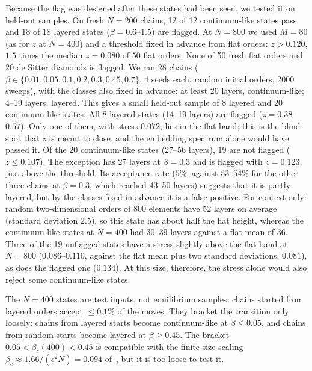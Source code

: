 \documentclass[12pt]{iopart}
\begin{document}
Because the flag was designed after these states had been seen, we tested it on held-out samples. On fresh $N=200$ chains, 12 of 12 continuum-like states pass and 18 of 18 layered states ($\beta=0.6$--$1.5$) are flagged. At $N=800$ we used $M=80$ (as for $z$ at $N=400$) and a threshold fixed in advance from flat orders: $z>0.120$, $1.5$ times the median $z=0.080$ of 50 flat orders. None of 50 fresh flat orders and 20 de Sitter diamonds is flagged. We ran 28 chains ($\beta\in\{0.01,0.05,0.1,0.2,0.3,0.45,0.7\}$, 4 seeds each, random initial orders, 2000 sweeps), with the classes also fixed in advance: at least 20 layers, continuum-like; 4--19 layers, layered. This gives a small held-out sample of 8 layered and 20 continuum-like states. All 8 layered states (14--19 layers) are flagged ($z=0.38$--$0.57$). Only one of them, with stress $0.072$, lies in the flat band; this is the blind spot that $z$ is meant to close, and the embedding spectrum alone would have passed it. Of the 20 continuum-like states (27--56 layers), 19 are not flagged ($z\leq0.107$). The exception has 27 layers at $\beta=0.3$ and is flagged with $z=0.123$, just above the threshold. Its acceptance rate ($5\%$, against $53$--$54\%$ for the other three chains at $\beta=0.3$, which reached 43--50 layers) suggests that it is partly layered, but by the classes fixed in advance it is a false positive. For context only: random two-dimensional orders of $800$ elements have $52$ layers on average (standard deviation $2.5$), so this state has about half the flat height, whereas the continuum-like states at $N=400$ had $30$--$39$ layers against a flat mean of $36$. Three of the 19 unflagged states have a stress slightly above the flat band at $N=800$ ($0.086$--$0.110$, against the flat mean plus two standard deviations, $0.081$), as does the flagged one ($0.134$). At this size, therefore, the stress alone would also reject some continuum-like states.

The $N=400$ states are test inputs, not equilibrium samples: chains started from layered orders accept $\leq0.1\%$ of the moves. They bracket the transition only loosely: chains from layered starts become continuum-like at $\beta\leq0.05$, and chains from random starts become layered at $\beta\geq0.45$. The bracket $0.05<\beta_c(400)<0.45$ is compatible with the finite-size scaling $\beta_c\approx1.66/(\epsilon^2N)=0.094$ of~\cite{GOS18}, but it is too loose to test it.
\end{document}
